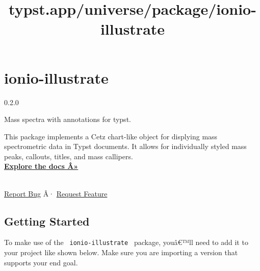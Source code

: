 \title{typst.app/universe/package/ionio-illustrate}

\label{banner}
\section{ionio-illustrate}\label{ionio-illustrate}

{ 0.2.0 }

Mass spectra with annotations for typst.

\label{readme}
\label{readme-top}{}

\href{https://github.com/jamesxx/ionio-illustrate/blob/master/LICENSE}{}
\href{https://github.com/typst/packages/tree/main/packages/preview/ionio-illustrate}{}
\href{https://github.com/JamesxX/ionio-illustrate/tags}{}

This package implements a Cetz chart-like object for displying mass
spectrometric data in Typst documents. It allows for individually styled
mass peaks, callouts, titles, and mass callipers.\\

\href{https://github.com/jamesxx/ionio-illustrate/blob/main/manual.pdf}{\textbf{Explore
the docs Â»}}\\
\strut \\
\href{https://github.com/jamesxx/ionio-illustrate/issues}{Report Bug} Â·
\href{https://github.com/jamesxx/ionio-illustrate/issues}{Request
Feature}

\subsection{Getting Started}\label{getting-started}

To make use of the \texttt{\ ionio-illustrate\ } package, youâ€™ll need
to add it to your project like shown below. Make sure you are importing
a version that supports your end goal.

\begin{Shaded}
\begin{Highlighting}[]
\end{Highlighting}
\end{Shaded}

